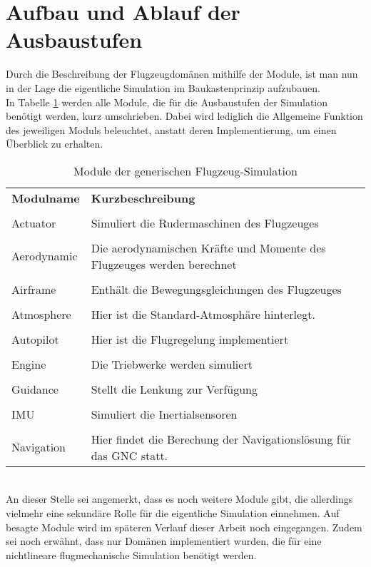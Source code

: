 \section{Aufbau und Ablauf der Ausbaustufen}
\label{sec:Ausbaustufen}
Durch die Beschreibung der Flugzeugdomänen mithilfe der Module, ist man nun in der Lage die eigentliche Simulation im Baukastenprinzip aufzubauen.\\ In Tabelle \ref{tab:Modulbeschreibungen} werden alle Module, die für die Ausbaustufen der Simulation benötigt werden, kurz umschrieben. Dabei wird lediglich die Allgemeine Funktion des jeweiligen Moduls beleuchtet, anstatt deren Implementierung, um einen Überblick zu erhalten. \\
\begin{table}[h]
	\centering	\begin{tabular}{l p{9cm}}
		\textbf{Modulname} & \textbf{Kurzbeschreibung}\\\\
		Actuator	& Simuliert die Rudermaschinen des Flugzeuges\\\\
		Aerodynamic & Die aerodynamischen Kräfte und Momente des Flugzeuges werden berechnet\\\\
		Airframe & Enthält die Bewegungsgleichungen des Flugzeuges\\\\
		Atmosphere & Hier ist die Standard-Atmosphäre hinterlegt.\\\\
		Autopilot & Hier ist die Flugregelung implementiert\\\\
		Engine & Die Triebwerke werden simuliert\\\\
		Guidance & Stellt die Lenkung zur Verfügung\\\\
		IMU & Simuliert die Inertialsensoren\\\\
		Navigation & Hier findet die Berechung der Navigationslösung für das GNC statt.
	\end{tabular}
	\caption{Module der generischen Flugzeug-Simulation}
	\label{tab:Modulbeschreibungen}
\end{table}\\
An dieser Stelle sei angemerkt, dass es noch weitere Module gibt, die allerdings vielmehr eine sekundäre Rolle für die eigentliche Simulation einnehmen. Auf besagte Module wird im späteren Verlauf dieser Arbeit noch eingegangen. Zudem sei noch erwähnt, dass nur Domänen implementiert wurden, die für eine nichtlineare flugmechanische Simulation benötigt werden. \\
